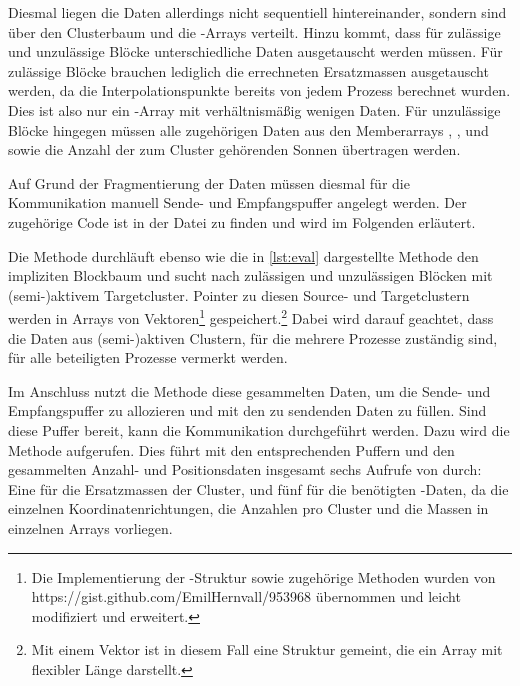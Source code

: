     Diesmal liegen die Daten allerdings nicht sequentiell hintereinander, sondern sind über den Clusterbaum und die -Arrays verteilt. Hinzu kommt, dass für zulässige und unzulässige
    Blöcke unterschiedliche Daten ausgetauscht werden müssen. Für zulässige Blöcke brauchen lediglich die errechneten Ersatzmassen ausgetauscht werden, da die Interpolationspunkte bereits von jedem 
    Prozess berechnet wurden. Dies ist also nur ein -Array mit verhältnismäßig wenigen Daten.
    Für unzulässige Blöcke hingegen müssen alle zugehörigen Daten aus den Memberarrays , ,  und  sowie die Anzahl der zum Cluster gehörenden
    Sonnen übertragen werden.
    
    Auf Grund der Fragmentierung der Daten müssen diesmal für die Kommunikation manuell Sende- und Empfangspuffer angelegt werden. Der zugehörige Code ist in der Datei  zu finden und wird
    im Folgenden erläutert.
    
    Die Methode  durchläuft ebenso wie die in \autoref{lst:eval} dargestellte Methode  den impliziten Blockbaum und sucht nach 
    zulässigen und unzulässigen Blöcken mit (semi-)aktivem Targetcluster. Pointer zu diesen Source- und Targetclustern werden in Arrays von Vektoren\footnote{Die Implementierung der -Struktur
    sowie zugehörige Methoden wurden von https://\-gist.\-github.com/\-EmilHernvall/953968 übernommen und leicht modifiziert und erweitert.} gespeichert.\footnote{Mit einem Vektor ist in diesem Fall 
    eine Struktur gemeint, die ein Array mit flexibler Länge darstellt.} Dabei wird darauf geachtet, dass die Daten aus (semi-)aktiven Clustern, für die mehrere Prozesse zuständig sind, für alle 
    beteiligten Prozesse vermerkt werden.
    
    Im Anschluss nutzt die Methode  diese gesammelten Daten, um die Sende- und Empfangspuffer zu allozieren und mit den zu sendenden Daten zu füllen. Sind diese Puffer bereit,
    kann die Kommunikation durchgeführt werden. Dazu wird die Methode  aufgerufen. Dies führt mit den entsprechenden Puffern und den gesammelten Anzahl- und Positionsdaten
    insgesamt sechs Aufrufe von  durch: Eine für die Ersatzmassen der Cluster, und fünf für die benötigten -Daten, da die einzelnen Koordinatenrichtungen, die 
    Anzahlen pro Cluster und die Massen in einzelnen Arrays vorliegen.
    
